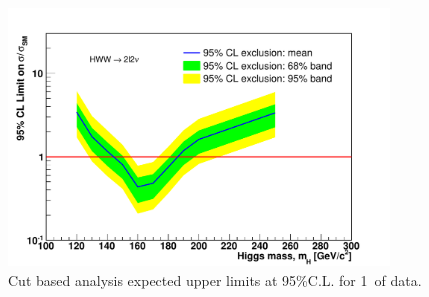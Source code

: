 \begin{figure}[!htbp]
\begin{center}
   \includegraphics[width=0.9\textwidth]{figures/cut_based_limits.pdf}
   \caption{Cut based analysis expected upper limits at 95\%C.L. for 1\ifb\ of data.}
   \label{fig:cutbase_uls}
\end{center}
\end{figure}
